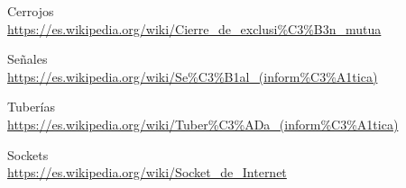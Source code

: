 \begin{thebibliography}{9}
\bibitem{} 
Cerrojos
\\\url{https://es.wikipedia.org/wiki/Cierre_de_exclusi\%C3\%B3n_mutua}

\bibitem{} 
Señales
\\\url{https://es.wikipedia.org/wiki/Se\%C3\%B1al_(inform\%C3\%A1tica)}

\bibitem{} 
Tuberías
\\\url{https://es.wikipedia.org/wiki/Tuber\%C3\%ADa_(inform\%C3\%A1tica)}

\bibitem{} 
Sockets
\\\url{https://es.wikipedia.org/wiki/Socket\_de\_Internet}
\end{thebibliography}